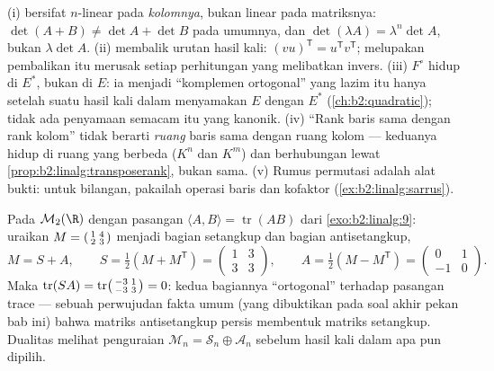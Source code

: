 \begin{remark}\label{rem:b2:linalg:pitfalls}
(i)  bersifat $n$-linear pada \emph{kolomnya}, bukan
linear pada matriksnya: $\det(A + B) \neq \det A + \det B$ pada
umumnya, dan $\det(\lambda A) = \lambda^n\det A$, bukan
$\lambda\det A$. (ii)  membalik urutan hasil kali:
$(vu)^{\mathsf T} = u^{\mathsf T}v^{\mathsf T}$; melupakan
pembalikan itu merusak setiap perhitungan yang melibatkan invers. (iii)
 $F^\circ$ hidup di $E^*$, bukan di $E$: ia menjadi
``komplemen ortogonal'' yang lazim itu hanya setelah suatu hasil kali
dalam menyamakan $E$ dengan $E^*$ (\cref{ch:b2:quadratic}); tidak ada
penyamaan semacam itu yang kanonik. (iv) ``Rank baris sama dengan rank
kolom'' tidak berarti \emph{ruang} baris sama dengan ruang kolom ---
keduanya hidup di ruang yang berbeda ($K^n$ dan $K^m$) dan
berhubungan lewat \cref{prop:b2:linalg:transposerank}, bukan sama.
(v) Rumus permutasi adalah alat bukti: untuk bilangan, pakailah
operasi baris dan kofaktor (\cref{ex:b2:linalg:sarrus}).
\end{remark}

\begin{example}\label{ex:b2:linalg:tracepairing}
Pada $\mathcal{M}_2(\R)$ dengan pasangan $\langle A, B\rangle =
\operatorname{tr}(AB)$ dari \cref{exo:b2:linalg:9}: uraikan $M =
\begin{psmallmatrix}1 & 4\\ 2 & 3\end{psmallmatrix}$ menjadi
bagian setangkup dan bagian antisetangkup,
\[
M = S + A, \qquad
S = \tfrac12(M + M^{\mathsf T}) =
\begin{pmatrix}1 & 3\\ 3 & 3\end{pmatrix},
\qquad
A = \tfrac12(M - M^{\mathsf T}) =
\begin{pmatrix}0 & 1\\ -1 & 0\end{pmatrix}.
\]
Maka $\operatorname{tr}(SA) = \operatorname{tr}
\begin{psmallmatrix}-3 & 1\\ -3 & 3\end{psmallmatrix} = 0$: kedua
bagiannya ``ortogonal'' terhadap pasangan trace --- sebuah
perwujudan fakta umum (yang dibuktikan pada soal akhir pekan
bab ini) bahwa matriks antisetangkup persis membentuk
 matriks setangkup. Dualitas melihat penguraian
$\mathcal{M}_n = \mathcal{S}_n \oplus
\mathcal{A}_n$ sebelum hasil kali dalam apa pun dipilih.
\end{example}

